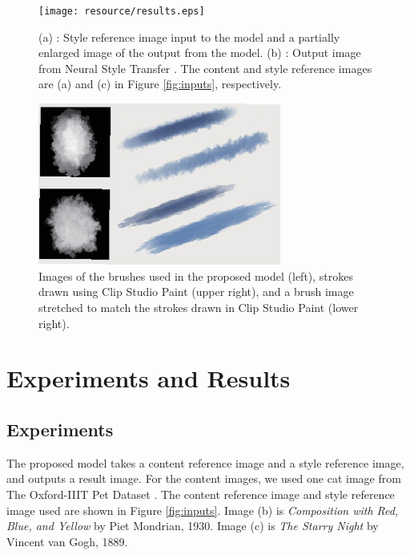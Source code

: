 \documentclass{mva_style}
\begin{document}
\begin{figure}[t]
  \centering
  \texttt{[image: resource/results.eps]}
  \caption{(a) : Style reference image input to the model and a partially enlarged image of the output from the model.
           (b) : Output image from Neural Style Transfer \cite{ImageStyleTransfer}.
           The content and style reference images are (a) and (c) in Figure \ref{fig:inputs}, respectively.
         }
  \label{fig:result}
\end{figure}

\begin{figure}[t]
  \centering
  \includegraphics[width=80mm]{resource/brush_discussion.eps}
  \caption{Images of the brushes used in the proposed model (left), 
  strokes drawn using Clip Studio Paint (upper right), 
  and a brush image stretched to match the strokes drawn in Clip Studio Paint (lower right).}
  \label{fig:discussion}
\end{figure}

\section{Experiments and Results}

\subsection{Experiments}
The proposed model takes a content reference image and a style reference image, 
and outputs a result image. For the content images, we used one cat image from 
The Oxford-IIIT Pet Dataset \cite{oxford-dataset}.
The content reference image and style reference image used are shown in Figure \ref{fig:inputs}.
Image (b) is \textit{Composition with Red,
Blue, and Yellow} by Piet Mondrian, 1930. Image (c) is \textit{The Starry Night} 
by Vincent van Gogh, 1889.
\end{document}

